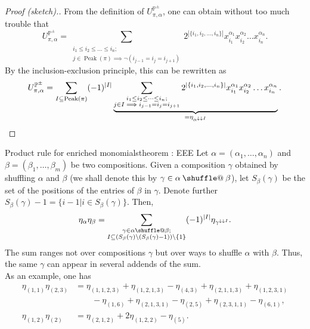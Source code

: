 \documentclass[numbers=enddot,12pt,final,onecolumn,notitlepage]{scrartcl}%
\makeatletter
\newcommand{\al}{\alpha}
\newcommand{\be}{\beta}
\newcommand{\PP}{\mathbb{P}} %
\newcommand{\Peak}{\operatorname{Peak}}
\providecommand*{\shuffle}{%
  \mathbin{\mathpalette\shuffle@{}}%
}
\newcommand*{\shuffle@}[2]{%
  \sbox0{$#1\vcenter{}$}%
  \kern .15\ht0 %
  \rlap{\vrule height .25\ht0 depth 0pt width 2.5\ht0}%
  \raise.1\ht0\hbox to 2.5\ht0{%
    \vrule height 1.75\ht0 depth -.1\ht0 width .17\ht0 %
    \hfill
    \vrule height 1.75\ht0 depth -.1\ht0 width .17\ht0 %
    \hfill
    \vrule height 1.75\ht0 depth -.1\ht0 width .17\ht0 %
  }%
  \kern .15\ht0 %
}
\newcommand{\0}{\phantom{c}}
\let\sumnonlimits\sum
\renewcommand{\sum}{\sumnonlimits\limits}
\makeatother
\begin{document}
\begin{proof}[Proof (sketch).]
From the definition of  $U^{\PP^\pm}_{\pi,\al}$, one can obtain without too much trouble that
\begin{equation*}
U^{\PP^\pm}_{\pi,\al} = \sum_{\substack{i_1\leq i_2\leq\dots \leq i_n;\\j\in \Peak(\pi) \implies \lnot \left( i_{j-1}=i_{j}=i_{j+1}\right)}}2^{|\{i_1,i_2,\dots,i_n\}|}x_{i_1}^{\al_1}x_{i_2}^{\al_2}\dots x_{i_n}^{\al_n} .
\end{equation*}
By the inclusion-exclusion principle, this can be rewritten as
\begin{equation*}
U^{\PP^\pm}_{\pi,\al} =\sum_{I \subseteq \Peak(\pi)}(-1)^{|I|} \underbrace{\sum_{\substack{i_1\leq i_2\leq\dots \leq i_n;\\j\in I \implies  i_{j-1}=i_{j}=i_{j+1}}}2^{|\{i_1,i_2,\dots,i_n\}|}x_{i_1}^{\al_1}x_{i_2}^{\al_2}\dots x_{i_n}^{\al_n}}_{\substack{= \eta_{\al^{\downarrow\downarrow I}}\\}} .
\qedhere
\end{equation*}
\end{proof}
%
\begin{theorem}{Product rule for enriched monomials}{theorem : EEE}
Let $\al=(\al_1,\dots,\al_n)$ and $\beta=(\be_1,\dots,\be_m)$ be two compositions. Given a composition $\gamma$ obtained by shuffling $\al$ and $\be$ (we shall denote this by $\gamma \in \al\shuffle\be$), let $S_\beta(\gamma)$ be the set of the positions of the entries of $\beta$ in $\gamma$. Denote further $S_\beta(\gamma)-1 =\{i-1|i \in S_\beta(\gamma)\}$. Then,
\begin{equation}
\label{eq : EEE}
\eta_\al \eta_\beta
= \sum_{\substack{\gamma \in \al \shuffle \be ;\\
                   I\subseteq \left(S_{\be}(\gamma)\setminus (S_{\be}(\gamma)-1)\right) \setminus \left\{1\right\}}}
(-1)^{|I|}\eta_{\gamma^{\downarrow\downarrow I}} .
\end{equation}
The sum ranges not over compositions $\gamma$ but over ways to shuffle $\al$ with $\be$. Thus, the same $\gamma$ can appear in several addends of the sum.\\
As an example, one has
\begin{align*}
\eta_{(1,1)}\eta_{(2,3)} &= \eta_{(1, 1, 2, 3)} + \eta_{(1, 2, 1, 3)} -\eta_{(4, 3)} + \eta_{(2,1,1,3)}+\eta_{(1,2,3,1)}\\
&\qquad -\eta_{(1,6)}+\eta_{(2,1,3,1)}-\eta_{(2,5)}+\eta_{(2,3,1,1)}-\eta_{(6,1)},\\
\eta_{(1,2)}\eta_{(2)} &=  \eta_{(2,1,2)} +   2\eta_{(1,2,2)} - \eta_{(5)}.
\end{align*}
\end{theorem}
\end{document}
